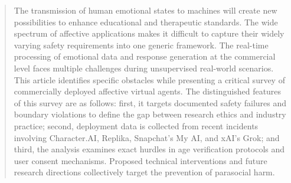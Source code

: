 \begin{abstract}
The transmission of human emotional states to machines will create new possibilities to enhance educational and therapeutic standards. The wide spectrum of affective applications makes it difficult to capture their widely varying safety requirements into one generic framework. The real-time processing of emotional data and response generation at the commercial level faces multiple challenges during unsupervised real-world scenarios. This article identifies specific obstacles while presenting a critical survey of commercially deployed affective virtual agents. The distinguished features of this survey are as follows: first, it targets documented safety failures and boundary violations to define the gap between research ethics and industry practice; second, deployment data is collected from recent incidents involving Character.AI, Replika, Snapchat's My AI, and xAI's Grok; and third, the analysis examines exact hurdles in age verification protocols and user consent mechanisms. Proposed technical interventions and future research directions collectively target the prevention of parasocial harm.
\end{abstract}
